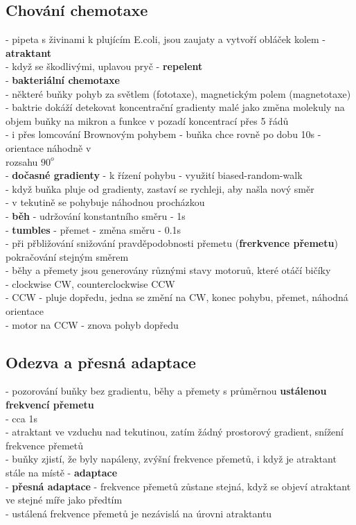 \documentclass[11pt,a4paper]{report}
\begin{document}
\subsection{Chování chemotaxe}
- pipeta s živinami k plujícím E.coli, jsou zaujaty a vytvoří obláček kolem - \textbf{atraktant}\\
\indent - když se škodlivými, uplavou pryč - \textbf{repelent}\\
\indent - \textbf{bakteriální chemotaxe}\\
- některé buňky pohyb za světlem (fototaxe), magnetickým polem (magnetotaxe)\\
- baktrie dokáží detekovat koncentrační gradienty malé jako změna molekuly na objem buňky na mikron a funkce v pozadí koncentrací přes 5 řádů\\
\indent - i přes lomcování Brownovým pohybem - buňka chce rovně po dobu 10s - orientace náhodně v\\
\indent \indent rozsahu $90^o$\\
- \textbf{dočasné gradienty} - k řízení pohybu - využití biased-random-walk\\
\indent - když buňka pluje od gradienty, zastaví se rychleji, aby našla nový směr\\
\indent - v tekutině se pohybuje náhodnou procházkou\\
\indent - \textbf{běh} - udržování konstantního směru - 1s\\
\indent - \textbf{tumbles} - přemet - změna směru - 0.1s\\
\indent - při přbližování snižování pravděpodobnosti přemetu (\textbf{frerkvence přemetu})\\
\indent \indent pokračování stejným směrem\\
- běhy a přemety jsou generovány různými stavy motoruů, které otáčí bičíky\\
\indent - clockwise CW, counterclockwise CCW\\
\indent - CCW - pluje dopředu, jedna se změní na CW, konec pohybu, přemet, náhodná orientace\\
\indent \indent - motor na CCW - znova pohyb dopředu\\

\subsection{Odezva a přesná adaptace}
- pozorování buňky bez gradientu, běhy a přemety s průměrnou \textbf{ustálenou frekvencí přemetu}\\
\indent - cca 1s\\
- atraktant ve vzduchu nad tekutinou, zatím žádný prostorový gradient, snížení frekvence přemetů\\
- buňky zjistí, že byly napáleny, zvýšní frekvence přemetů, i když je atraktant stále na místě - \textbf{adaptace}\\
- \textbf{přesná adaptace} - frekvence přemetů zůstane stejná, když se objeví atraktant ve stejné míře jako předtím\\
\indent - ustálená frekvence přemetů je nezávislá na úrovni atraktantu\\
\end{document}
